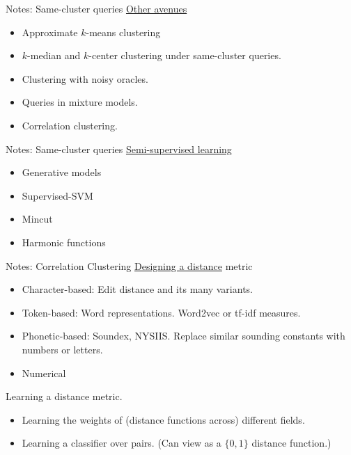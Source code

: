 \documentclass{beamer}
\begin{document}
\begin{frame}[label=notesQueryTakeaways]{Notes: Same-cluster queries}
	\hyperlink{queryTakeaways}{Other avenues}
	\begin{itemize}
		\item Approximate $k$-means clustering
		\item $k$-median and $k$-center clustering under same-cluster queries.
		\item Clustering with noisy oracles.
		\item Queries in mixture models.
		\item Correlation clustering.
	\end{itemize}
\end{frame}

\begin{frame}{Notes: Same-cluster queries}
	\hyperlink{queryTakeaways}{Semi-supervised learning}
	\begin{itemize}
		\item Generative models
		\item Supervised-SVM
		\item Mincut
		\item Harmonic functions
	\end{itemize}
\end{frame}

\begin{frame}[label=notesCC]{Notes: Correlation Clustering}
	\hyperlink{CC}{Designing a distance} metric
	\begin{itemize}
		\item Character-based: Edit distance and its many variants.
		\item Token-based: Word representations. Word2vec or tf-idf measures.
		\item Phonetic-based: Soundex, NYSIIS. Replace similar sounding constants with numbers or letters.
		\item Numerical
	\end{itemize}
	Learning a distance metric.
	\begin{itemize}
		\item Learning the weights of (distance functions across) different fields.
		\item Learning a classifier over pairs. (Can view as a $\{0, 1\}$ distance function.)
	\end{itemize}
\end{frame}
\end{document}
